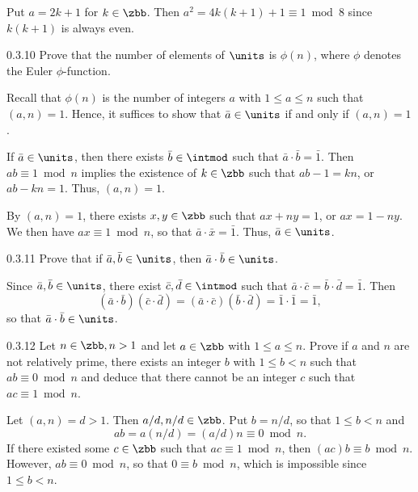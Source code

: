 \begin{sol}
    Put $a = 2k + 1$ for $k \in \zbb$.
	Then $a^2 = 4k(k + 1) + 1 \equiv 1 \bmod 8$ since $k(k + 1)$ is always even.
\end{sol}

\begin{spex}{0.3.10}
    Prove that the number of elements of $\units$ is $\phi(n)$, where $\phi$ denotes the Euler $\phi$-function.
\end{spex}

\begin{sol}[spsol]
    Recall that $\phi(n)$ is the number of integers $a$ with $1 \leq a \leq n$ such that $(a, n) = 1$.
    Hence, it suffices to show that $\bar a \in \units$ if and only if $(a, n) = 1$.
    
    \rightimp If $\bar a \in \units$, then there exists $\bar b \in \intmod$ such that $\bar a \cdot \bar b = \bar 1$.
    Then $ab \equiv 1 \bmod n$ implies the existence of $k \in \zbb$ such that $ab - 1 = kn$, or $ab - kn = 1$.
    Thus, $(a, n) = 1$.
    
    \leftimp By $(a, n) = 1$, there exists $x, y \in \zbb$ such that $ax + ny = 1$, or $ax = 1 - ny$.
    We then have $ax \equiv 1 \bmod n$, so that $\bar a \cdot \bar x = \bar 1$.
    Thus, $\bar a \in \units$.
\end{sol}

\begin{exercise}{0.3.11}
    Prove that if $\bar a, \bar b \in \units$, then $\bar a \cdot \bar b \in \units$.
\end{exercise}

\begin{sol}
    Since $\bar a, \bar b \in \units$, there exist $\bar c, \bar d \in \intmod$ such that $\bar a \cdot \bar c = \bar b \cdot \bar d = \bar 1$.
	Then
    \[
    	(\bar a \cdot \bar b)(\bar c \cdot \bar d) = (\bar a \cdot \bar c)(\bar b \cdot \bar d) = \bar 1 \cdot \bar 1 = \bar 1,
    \]
    so that $\bar a \cdot \bar b \in \units$.
\end{sol}

\begin{exercise}{0.3.12}
    Let $n \in \zbb, n > 1$ and let $a \in \zbb$ with $1 \leq a \leq n$.
	Prove if $a$ and $n$ are not relatively prime, there exists an integer $b$ with $1 \leq b < n$ such that $ab \equiv 0 \bmod n$ and deduce that there cannot be an integer $c$ such that $ac \equiv 1 \bmod n$.
\end{exercise}

\begin{sol}
    Let $(a, n) = d > 1$.
	Then $a/d, n/d \in \zbb$.
	Put $b = n/d$, so that $1 \leq b < n$ and
    \[
    	ab = a(n/d) = (a/d)n \equiv 0 \bmod n.
    \]
    If there existed some $c \in \zbb$ such that $ac \equiv 1 \bmod n$, then $(ac)b \equiv b \bmod n$.
	However, $ab \equiv 0 \bmod n$, so that $0 \equiv b \bmod n$, which is impossible since $1 \leq b < n$.
\end{sol}

